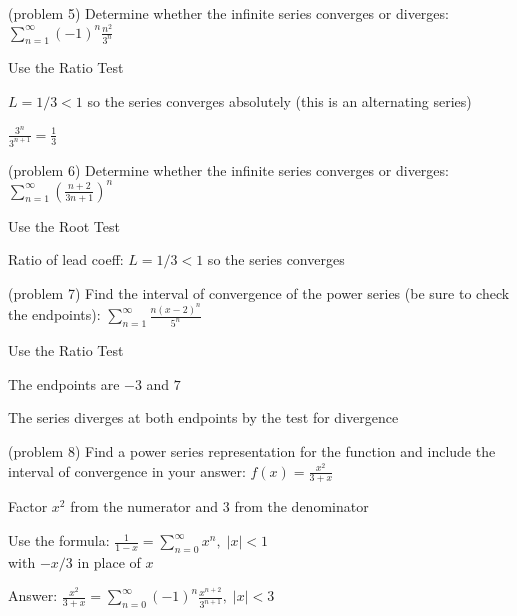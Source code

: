 \documentclass[handout]{ximera}
\begin{document}
\begin{problem}(problem 5)
Determine whether the infinite series converges or diverges: 
$\displaystyle \sum_{n=1}^\infty (-1)^n\frac{n^2}{3^n}$

\begin{hint}
Use the Ratio Test
\end{hint}

\begin{hint}
$L = 1/3 < 1$ so the series converges absolutely (this is an alternating series)
\end{hint}

\begin{hint}
$\frac{3^n}{3^{n+1}} = \frac13$
\end{hint}

\end{problem}


\begin{problem}(problem 6)
Determine whether the infinite series converges or diverges: 
$\displaystyle \sum_{n=1}^\infty \left(\frac{n+ 2}{3n+1}\right)^n$

\begin{hint}
Use the Root Test
\end{hint}

\begin{hint}
Ratio of lead coeff: $L = 1/3 < 1$ so the series converges
\end{hint}

\end{problem}

\begin{problem} (problem 7)
Find the interval of convergence of the power series (be sure to check the endpoints):
$\displaystyle \sum_{n=1}^\infty \frac{n(x-2)^n}{5^n}$

\begin{hint}
Use the Ratio Test
\end{hint}
\begin{hint}
The endpoints are $-3$ and $7$
\end{hint}
\begin{hint}
The series diverges at both endpoints by the test for divergence
\end{hint}

\end{problem}


\begin{problem} (problem 8)
Find a power series representation for the function and include the interval of convergence in your answer:
$\displaystyle f(x) = \frac{x^2}{3 + x}$

\begin{hint}
Factor $x^2$ from the numerator and $3$ from the denominator
\end{hint}
\begin{hint}
Use the formula: $\displaystyle \frac{1}{1-x} = \sum_{n = 0}^\infty x^n, \; |x| <1$\\
with $-x/3$ in place of $x$
\end{hint}
\begin{hint}
Answer: 
$\displaystyle \frac{x^2}{3 + x} = \sum_{n = 0}^\infty (-1)^n \frac{x^{n+2}}{3^{n+1}}, \; |x| <3$
\end{hint}
\end{problem}
\end{document}
